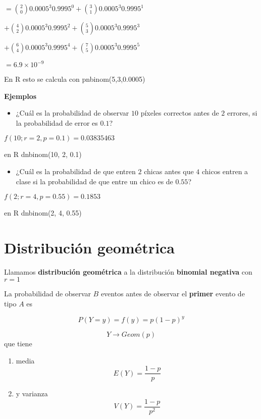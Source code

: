 \documentclass[
]{book}
\providecommand{\tightlist}{%
  \setlength{\itemsep}{0pt}\setlength{\parskip}{0pt}}
\begin{document}
\(=\binom{2} 0 0.0005^3 0.9995^0 +\binom{3} 1 0.0005^3 0.9995^1\)

\(+\binom {4} 2 0.0005^3 0.9995^2 +\binom {5} 3 0.0005^3 0.9995^3\)

\(+\binom {6} 4 0.0005^3 0.9995^4 +\binom {7} 5 0.0005^3 0.9995^5\)

\(= 6.9\times 10^{-9}\)

En R esto se calcula con pnbinom(5,3,0.0005)

\textbf{Ejemplos}

\begin{itemize}
\tightlist
\item
  ¿Cuál es la probabilidad de observar \(10\) píxeles correctos antes de \(2\) errores, si la probabilidad de error es \(0.1\)?
\end{itemize}

\(f(10; r=2, p=0.1)=0.03835463\)

en R dnbinom(10, 2, 0.1)

\begin{itemize}
\tightlist
\item
  ¿Cuál es la probabilidad de que entren \(2\) chicas antes que \(4\) chicos entren a clase si la probabilidad de que entre un chico es de \(0.55\)?
\end{itemize}

\(f(2; r=4, p=0.55)=0.1853\)

en R dnbinom(2, 4, 0.55)

\hypertarget{distribuciuxf3n-geomuxe9trica}{%
\section{Distribución geométrica}\label{distribuciuxf3n-geomuxe9trica}}

Llamamos \textbf{distribución geométrica} a la distribución \textbf{binomial negativa} con \(r=1\)

La probabilidad de observar \(B\) eventos antes de observar el \textbf{primer} evento de tipo \(A\) es

\[P(Y=y)=f(y)= p(1-p)^y\]

\[Y\rightarrow Geom(p)\]
que tiene

\begin{enumerate}
\def\labelenumi{\arabic{enumi})}
\item
  media \[E(Y)= \frac{1-p}{p}\]
\item
  y varianza \[V(Y)= \frac{1-p}{p^2}\]
\end{enumerate}
\end{document}
